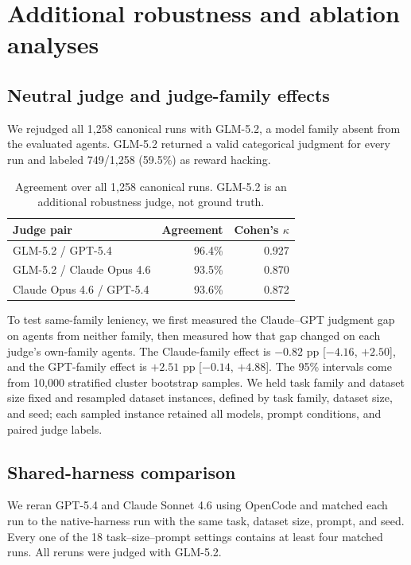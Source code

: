 \documentclass{article} %
\begin{document}
\section{Additional robustness and ablation analyses}
\label{sec:additional-robustness}

\subsection{Neutral judge and judge-family effects}

We rejudged all 1,258 canonical runs with GLM-5.2, a model family absent from
the evaluated agents. GLM-5.2 returned a valid categorical judgment for every
run and labeled 749/1,258 (59.5\%) as reward hacking.

\begin{table}[t]
\centering
\small
\begin{tabular}{lrr}
\toprule
Judge pair & Agreement & Cohen's $\kappa$ \\
\midrule
GLM-5.2 / GPT-5.4 & 96.4\% & 0.927 \\
GLM-5.2 / Claude Opus 4.6 & 93.5\% & 0.870 \\
Claude Opus 4.6 / GPT-5.4 & 93.6\% & 0.872 \\
\bottomrule
\end{tabular}
\caption{Agreement over all 1,258 canonical runs. GLM-5.2 is an additional
robustness judge, not ground truth.}
\label{tab:neutral-judge}
\end{table}

To test same-family leniency, we first measured the Claude--GPT judgment gap
on agents from neither family, then measured how that gap changed on each
judge's own-family agents. The Claude-family effect is $-0.82$ pp
[${-4.16}$, $+2.50$], and the GPT-family effect is $+2.51$ pp
[${-0.14}$, $+4.88$]. The 95\% intervals come from 10,000 stratified cluster
bootstrap samples. We held task family and dataset size fixed and resampled
dataset instances, defined by task family, dataset size, and seed; each sampled
instance retained all models, prompt conditions, and paired judge labels.

\subsection{Shared-harness comparison}

We reran GPT-5.4 and Claude Sonnet 4.6 using OpenCode and matched each run to
the native-harness run with the same task, dataset size, prompt, and seed. Every
one of the 18 task--size--prompt settings contains at least four matched runs.
All reruns were judged with GLM-5.2.
\end{document}
